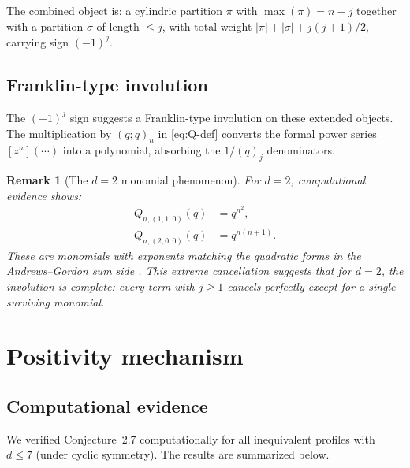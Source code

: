 \documentclass[11pt]{article}
\newtheorem{remark}[theorem]{Remark}
\newcommand{\qpochn}[3]{(#1;#2)_{#3}}
\begin{document}
The combined object is: a cylindric partition $\pi$ with $\max(\pi) = n - j$
together with a partition $\sigma$ of length $\leq j$, with total weight
$|\pi| + |\sigma| + j(j+1)/2$, carrying sign $(-1)^j$.

\subsection{Franklin-type involution}

The $(-1)^j$ sign suggests a Franklin-type involution on these extended objects.
The multiplication by $\qpochn{q}{q}{n}$ in \eqref{eq:Q-def} converts the
formal power series $[z^n](\cdots)$ into a polynomial, absorbing the $1/(q)_j$
denominators.

\begin{remark}[The $d=2$ monomial phenomenon]
For $d = 2$, computational evidence shows:
\begin{align*}
  Q_{n,(1,1,0)}(q) &= q^{n^2}, \\
  Q_{n,(2,0,0)}(q) &= q^{n(n+1)}.
\end{align*}
These are monomials with exponents matching the quadratic forms in the
Andrews--Gordon sum side \cite[eq.~1.2]{Warnaar2021}. This extreme cancellation
suggests that for $d = 2$, the involution is \emph{complete}: every term with
$j \geq 1$ cancels perfectly except for a single surviving monomial.
\end{remark}


\section{Positivity mechanism}
\label{sec:positivity}

\subsection{Computational evidence}

We verified Conjecture~2.7 computationally for all inequivalent profiles with
$d \leq 7$ (under cyclic symmetry). The results are summarized below.
\end{document}

